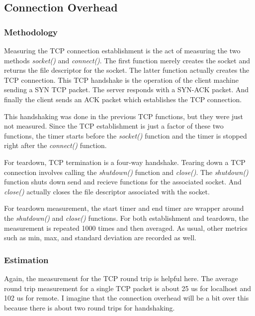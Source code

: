 \documentclass[paper=a4, fontsize=11pt]{scrartcl}
\numberwithin{equation}{section}        %
\numberwithin{figure}{section}          %
\numberwithin{table}{section}               %
\begin{document}
\subsection{Connection Overhead}

\subsubsection{Methodology}

Measuring the TCP connection establishment is the act of measuring the two methods \textit{socket()} and \textit{connect()}.  The first function merely creates the socket and returns the file descriptor for the socket.  The latter function actually creates the TCP connection.  This TCP handshake is the operation of the client machine sending a SYN TCP packet.  The server responds with a SYN-ACK packet.  And finally the client sends an ACK packet which establishes the TCP connection.

This handshaking was done in the previous TCP functions, but they were just not measured.  Since the TCP establishment is just a factor of these two functions, the timer starts before the \textit{socket()} function and the timer is stopped right after the \textit{connect()} function.

For teardown, TCP termination is a four-way handshake.  Tearing down a TCP connection involves calling the \textit{shutdown()} function and \textit{close()}.  The \textit{shutdown()} function shuts down send and recieve functions for the associated socket.  And \textit{close()} actually closes the file descriptor associated with the socket.

For teardown measurement, the start timer and end timer are wrapper around the \textit{shutdown()} and \textit{close()} functions.  For both establishment and teardown, the measurement is repeated 1000 times and then averaged.  As usual, other metrics such as min, max, and standard deviation are recorded as well.

\subsubsection{Estimation}

Again, the measurement for the TCP round trip is helpful here.  The average round trip measurement for a single TCP packet is about 25 us for localhost and 102 us for remote.  I imagine that the connection overhead will be a bit over this because there is about two round trips for handshaking.
\end{document}
